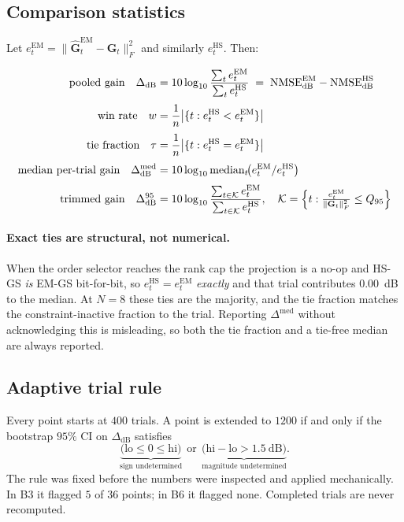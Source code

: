 \documentclass[11pt,a4paper]{article}
\newcommand{\mat}[1]{\mathbf{#1}}
\newcommand{\NMSE}{\mathrm{NMSE}}
\newcommand{\dB}{\mathrm{dB}}
\begin{document}
\subsection{Comparison statistics}
Let $e^{\mathrm{EM}}_t=\|\hat{\mat{G}}^{\mathrm{EM}}_t-\mat{G}_t\|_F^2$ and
similarly $e^{\mathrm{HS}}_t$. Then:

\begin{align}
\text{pooled gain}\quad
\Delta_{\dB} &= 10\log_{10}
  \frac{\sum_t e^{\mathrm{EM}}_t}{\sum_t e^{\mathrm{HS}}_t}
  \;=\;\NMSE^{\mathrm{EM}}_{\dB}-\NMSE^{\mathrm{HS}}_{\dB}
  \label{eq:gain}\\[1mm]
\text{win rate}\quad
w &= \frac{1}{n}\bigl|\{t: e^{\mathrm{HS}}_t<e^{\mathrm{EM}}_t\}\bigr|
  \label{eq:win}\\[1mm]
\text{tie fraction}\quad
\tau &= \frac{1}{n}\bigl|\{t: e^{\mathrm{HS}}_t=e^{\mathrm{EM}}_t\}\bigr|
  \label{eq:tie}\\[1mm]
\text{median per-trial gain}\quad
\Delta^{\mathrm{med}}_{\dB}
  &= 10\log_{10}\operatorname{median}_t\!\bigl(e^{\mathrm{EM}}_t/e^{\mathrm{HS}}_t\bigr)
  \label{eq:medgain}\\[1mm]
\text{trimmed gain}\quad
\Delta^{95}_{\dB} &= 10\log_{10}
  \frac{\sum_{t\in\mathcal{K}} e^{\mathrm{EM}}_t}
       {\sum_{t\in\mathcal{K}} e^{\mathrm{HS}}_t},\quad
  \mathcal{K}=\Bigl\{t:\tfrac{e^{\mathrm{EM}}_t}{\|\mat{G}_t\|_F^2}
    \le Q_{95}\Bigr\}
  \label{eq:trim}
\end{align}

\paragraph{Exact ties are structural, not numerical.} When the order selector
reaches the rank cap the projection is a no-op and HS-GS \emph{is} EM-GS
bit-for-bit, so $e^{\mathrm{HS}}_t=e^{\mathrm{EM}}_t$ \emph{exactly} and that
trial contributes $0.00$~dB to the median. At $N=8$ these ties are the
majority, and the tie fraction matches the constraint-inactive fraction to the
trial. Reporting $\Delta^{\mathrm{med}}$ without acknowledging this is
misleading, so both the tie fraction and a tie-free median are always
reported.

\subsection{Adaptive trial rule}
Every point starts at $400$ trials. A point is extended to $1200$ if and only
if the bootstrap $95\%$ CI on $\Delta_{\dB}$ satisfies
\begin{equation}
\underbrace{\bigl(\mathrm{lo}\le0\le\mathrm{hi}\bigr)}_{\text{sign undetermined}}
\ \ \text{or}\ \
\underbrace{\bigl(\mathrm{hi}-\mathrm{lo}>1.5\ \dB\bigr)}_{\text{magnitude undetermined}} .
\label{eq:extend}
\end{equation}
The rule was fixed before the numbers were inspected and applied
mechanically. In B3 it flagged $5$ of $36$ points; in B6 it flagged none.
Completed trials are never recomputed.
\end{document}
